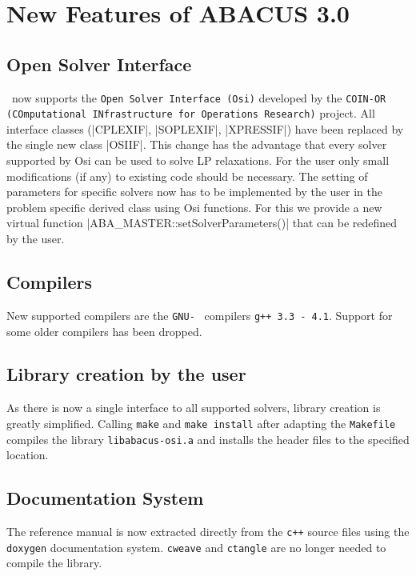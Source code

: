 \section{New Features of ABACUS 3.0}
\label{section:new30}

\subsection{Open Solver Interface}

\ABACUS\ now supports the {\tt Open Solver Interface (Osi)} developed by the 
{\tt COIN-OR (COmputational INfrastructure for Operations Research)} project.
All interface classes (|CPLEXIF|, |SOPLEXIF|, |XPRESSIF|) have been replaced by the single new class |OSIIF|.
This change has the advantage that every solver supported by Osi can be used to solve LP relaxations.
For the user only small modifications (if any) to existing code should be necessary.
The setting of parameters for specific solvers now has to be implemented by the 
user in the problem specific derived class using Osi functions.
For this we provide a new virtual function |ABA\_MASTER::setSolverParameters()| that can be redefined by the user. 

\subsection{Compilers}

New supported compilers are the {\tt GNU-\CPLUSPLUS\ } compilers {\tt g++ 3.3 - 4.1}. Support for some older compilers has been dropped. 

\subsection{Library creation by the user}

As there is now a single interface to all supported solvers, library creation is greatly simplified. Calling {\tt make} and {\tt make install} after adapting the {\tt Makefile} compiles the library {\tt libabacus-osi.a} and installs the header files to the specified location.

\subsection{Documentation System}
The reference manual is now extracted directly from the {\tt c++} source files using the {\tt doxygen} documentation system. {\tt cweave} and {\tt ctangle} are no longer needed to compile the library.

